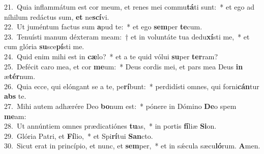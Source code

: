 {21.~}Quia inflammátum est cor meum, et renes mei commu\textbf{tá}ti sunt:~* et ego ad níhilum redáctus sum, \textbf{et} ne\textbf{scí}vi.\\
{22.~}Ut juméntum factus sum \textbf{a}pud te:~* et ego \textbf{sem}per \textbf{te}cum.\\
{23.~}Tenuísti manum déxteram meam:~† et in voluntáte tua dedu\textbf{xí}sti me,~* et cum glória \textbf{su}sce\textbf{pí}sti me.\\
{24.~}Quid enim mihi est in \textbf{cæ}lo?~* et a te quid vólui \textbf{su}per \textbf{ter}ram?\\
{25.~}Defécit caro mea, et cor \textbf{me}um:~* Deus cordis mei, et pars mea Deus \textbf{in} æ\textbf{tér}num.\\
{26.~}Quia ecce, qui elóngant se a te, pe\textbf{rí}bunt:~* perdidísti omnes, qui forni\textbf{cán}tur \textbf{abs} te.\\
{27.~}Mihi autem adhærére Deo \textbf{bo}num est:~* pónere in Dómino \textbf{De}o spem \textbf{me}am:\\
{28.~}Ut annúntiem omnes prædicatiónes \textbf{tu}as,~* in portis \textbf{fí}liæ \textbf{Si}on.\\
{29.~}Glória Patri, et \textbf{Fí}lio,~* et Spi\textbf{rí}tui \textbf{San}cto.\\
{30.~}Sicut erat in princípio, et nunc, et \textbf{sem}per,~* et in sǽcula sæcu\textbf{ló}rum. \textbf{A}men.\\
